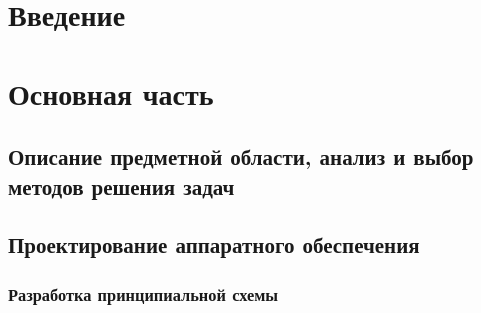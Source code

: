 \hypertarget{ux432ux432ux435ux434ux435ux43dux438ux435}{%
\section{Введение}\label{ux432ux432ux435ux434ux435ux43dux438ux435}}

\hypertarget{ux43eux441ux43dux43eux432ux43dux430ux44f-ux447ux430ux441ux442ux44c}{%
\section{Основная
часть}\label{ux43eux441ux43dux43eux432ux43dux430ux44f-ux447ux430ux441ux442ux44c}}

\hypertarget{ux43eux43fux438ux441ux430ux43dux438ux435-ux43fux440ux435ux434ux43cux435ux442ux43dux43eux439-ux43eux431ux43bux430ux441ux442ux438-ux430ux43dux430ux43bux438ux437-ux438-ux432ux44bux431ux43eux440-ux43cux435ux442ux43eux434ux43eux432-ux440ux435ux448ux435ux43dux438ux44f-ux437ux430ux434ux430ux447}{%
\subsection{Описание предметной области, анализ и выбор методов решения
задач}\label{ux43eux43fux438ux441ux430ux43dux438ux435-ux43fux440ux435ux434ux43cux435ux442ux43dux43eux439-ux43eux431ux43bux430ux441ux442ux438-ux430ux43dux430ux43bux438ux437-ux438-ux432ux44bux431ux43eux440-ux43cux435ux442ux43eux434ux43eux432-ux440ux435ux448ux435ux43dux438ux44f-ux437ux430ux434ux430ux447}}

\hypertarget{ux43fux440ux43eux435ux43aux442ux438ux440ux43eux432ux430ux43dux438ux435-ux430ux43fux43fux430ux440ux430ux442ux43dux43eux433ux43e-ux43eux431ux435ux441ux43fux435ux447ux435ux43dux438ux44f}{%
\subsection{Проектирование аппаратного
обеспечения}\label{ux43fux440ux43eux435ux43aux442ux438ux440ux43eux432ux430ux43dux438ux435-ux430ux43fux43fux430ux440ux430ux442ux43dux43eux433ux43e-ux43eux431ux435ux441ux43fux435ux447ux435ux43dux438ux44f}}

\hypertarget{ux440ux430ux437ux440ux430ux431ux43eux442ux43aux430-ux43fux440ux438ux43dux446ux438ux43fux438ux430ux43bux44cux43dux43eux439-ux441ux445ux435ux43cux44b}{%
\subsubsection{Разработка принципиальной
схемы}\label{ux440ux430ux437ux440ux430ux431ux43eux442ux43aux430-ux43fux440ux438ux43dux446ux438ux43fux438ux430ux43bux44cux43dux43eux439-ux441ux445ux435ux43cux44b}}

